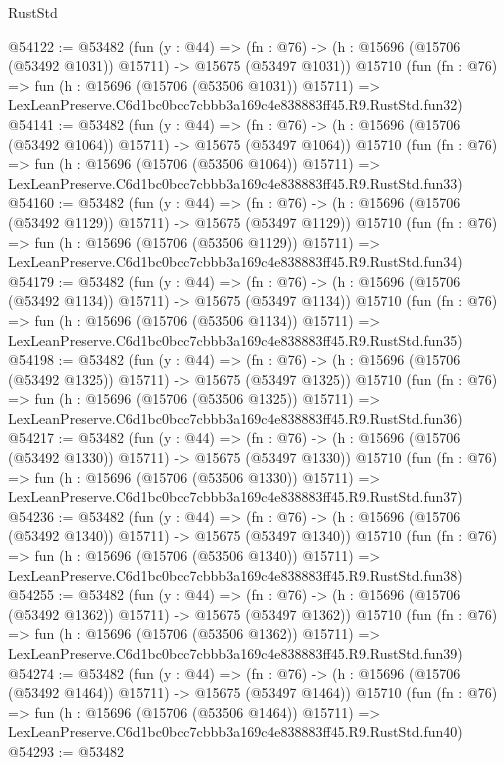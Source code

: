 \begin{lexlean}{RustStd}
\begin{coremodule}
@54122 := @53482
    (fun (y : @44) =>
    (fn : @76) -> (h : @15696 (@15706 (@53492 @1031)) @15711) -> @15675 (@53497 @1031))
    @15710
    (fun (fn : @76) =>
    fun (h : @15696 (@15706 (@53506 @1031)) @15711) =>
    LexLeanPreserve.C6d1bc0bcc7cbbb3a169c4e838883ff45.R9.RustStd.fun32)
@54141 := @53482
    (fun (y : @44) =>
    (fn : @76) -> (h : @15696 (@15706 (@53492 @1064)) @15711) -> @15675 (@53497 @1064))
    @15710
    (fun (fn : @76) =>
    fun (h : @15696 (@15706 (@53506 @1064)) @15711) =>
    LexLeanPreserve.C6d1bc0bcc7cbbb3a169c4e838883ff45.R9.RustStd.fun33)
@54160 := @53482
    (fun (y : @44) =>
    (fn : @76) -> (h : @15696 (@15706 (@53492 @1129)) @15711) -> @15675 (@53497 @1129))
    @15710
    (fun (fn : @76) =>
    fun (h : @15696 (@15706 (@53506 @1129)) @15711) =>
    LexLeanPreserve.C6d1bc0bcc7cbbb3a169c4e838883ff45.R9.RustStd.fun34)
@54179 := @53482
    (fun (y : @44) =>
    (fn : @76) -> (h : @15696 (@15706 (@53492 @1134)) @15711) -> @15675 (@53497 @1134))
    @15710
    (fun (fn : @76) =>
    fun (h : @15696 (@15706 (@53506 @1134)) @15711) =>
    LexLeanPreserve.C6d1bc0bcc7cbbb3a169c4e838883ff45.R9.RustStd.fun35)
@54198 := @53482
    (fun (y : @44) =>
    (fn : @76) -> (h : @15696 (@15706 (@53492 @1325)) @15711) -> @15675 (@53497 @1325))
    @15710
    (fun (fn : @76) =>
    fun (h : @15696 (@15706 (@53506 @1325)) @15711) =>
    LexLeanPreserve.C6d1bc0bcc7cbbb3a169c4e838883ff45.R9.RustStd.fun36)
@54217 := @53482
    (fun (y : @44) =>
    (fn : @76) -> (h : @15696 (@15706 (@53492 @1330)) @15711) -> @15675 (@53497 @1330))
    @15710
    (fun (fn : @76) =>
    fun (h : @15696 (@15706 (@53506 @1330)) @15711) =>
    LexLeanPreserve.C6d1bc0bcc7cbbb3a169c4e838883ff45.R9.RustStd.fun37)
@54236 := @53482
    (fun (y : @44) =>
    (fn : @76) -> (h : @15696 (@15706 (@53492 @1340)) @15711) -> @15675 (@53497 @1340))
    @15710
    (fun (fn : @76) =>
    fun (h : @15696 (@15706 (@53506 @1340)) @15711) =>
    LexLeanPreserve.C6d1bc0bcc7cbbb3a169c4e838883ff45.R9.RustStd.fun38)
@54255 := @53482
    (fun (y : @44) =>
    (fn : @76) -> (h : @15696 (@15706 (@53492 @1362)) @15711) -> @15675 (@53497 @1362))
    @15710
    (fun (fn : @76) =>
    fun (h : @15696 (@15706 (@53506 @1362)) @15711) =>
    LexLeanPreserve.C6d1bc0bcc7cbbb3a169c4e838883ff45.R9.RustStd.fun39)
@54274 := @53482
    (fun (y : @44) =>
    (fn : @76) -> (h : @15696 (@15706 (@53492 @1464)) @15711) -> @15675 (@53497 @1464))
    @15710
    (fun (fn : @76) =>
    fun (h : @15696 (@15706 (@53506 @1464)) @15711) =>
    LexLeanPreserve.C6d1bc0bcc7cbbb3a169c4e838883ff45.R9.RustStd.fun40)
@54293 := @53482

\end{coremodule}
\end{lexlean}
